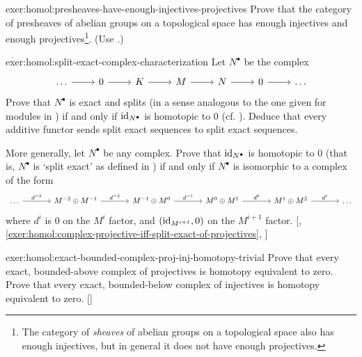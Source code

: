 \begin{exer}{}{exer:homol:presheaves-have-enough-injectives-projectives}
  Prove that the category of presheaves of abelian groups on a
  topological space has enough injectives and enough
  projectives\footnote{The category of \emph{sheaves} of abelian
    groups on a topological space also has enough injectives, but in
    general it does not have enough projectives.}. (Use
  .)
\end{exer}
\begin{exer}{\exerused{}}{exer:homol:split-exact-complex-characterization}
  Let $N^\bullet$ be the complex
  \[\begin{tikzcd}
      \dots \arrow[r] & 0 \arrow[r] & K \arrow[r] & M \arrow[r] & N
      \arrow[r] & 0 \arrow[r] & \dots
    \end{tikzcd}\] Prove that $N^\bullet$ is exact and splits (in a
  sense analogous to the one given for modules in
  ) if and only if
  $\operatorname{id}_{N^\bullet}$ is homotopic to $0$ (cf.
  ). Deduce that every additive
  functor sends split exact sequences to split exact sequences.

  More generally, let $N^\bullet$ be any complex. Prove that
  $\operatorname{id}_{N^\bullet}$ is homotopic to $0$ (that is, $N^\bullet$ is
  `split exact' as defined in
  )
  if and only if $N^\bullet$ is isomorphic to a complex of the form
  \[\begin{tikzcd}[column sep=large]
      \dots \arrow[r, "d^{-3}"] & M^{-2} \oplus M^{-1} \arrow[r,
      "d^{-2}"] & M^{-1} \oplus M^0 \arrow[r, "d^{-1}"] & M^0 \oplus
      M^1 \arrow[r, "d^0"] & M^1 \oplus M^2 \arrow[r, "d^1"] & \dots
    \end{tikzcd}\] where $d^i$ is $0$ on the $M^i$ factor, and
  $(\operatorname{id}_{M^{i+1}}, 0)$ on the $M^{i+1}$ factor.
  [,
  \ref{exer:homol:complex-projective-iff-split-exact-of-projectives},
  ]
\end{exer}
\begin{exer}{\exerused{}}{exer:homol:exact-bounded-complex-proj-inj-homotopy-trivial}
  Prove that every exact, bounded-above complex of projectives is
  homotopy equivalent to zero. Prove that every exact, bounded-below
  complex of injectives is homotopy equivalent to
  zero. []
\end{exer}

